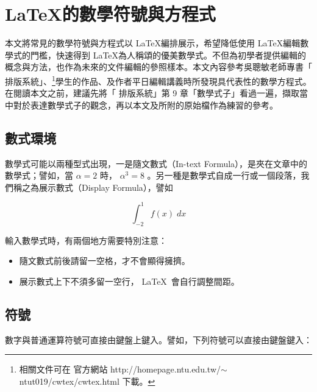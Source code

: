 %
%
\chapter{\LaTeX 的數學符號與方程式}
本文將常見的數學符號與方程式以 \LaTeX 編排展示，希望降低使用  \LaTeX 編輯數學式的門檻，快速得到  \LaTeX 為人稱頌的優美數學式。不但為初學者提供編輯的概念與方法，也作為未來的文件編輯的參照樣本。本文內容參考吳聰敏老師專書「\cw{} 排版系統」、\footnote{相關文件可在 \cw{} 官方網站 http://homepage.ntu.edu.tw/$\sim$ntut019/cwtex/cwtex.html 下載。}學生的作品、及作者平日編輯講義時所發現具代表性的數學方程式。在閱讀本文之前，建議先將「\cw{} 排版系統」第 9 章「數學式子」看過一遍，擷取當中對於表達數學式子的觀念，再以本文及所附的原始檔作為練習的參考。\\

\section{數式環境}
數學式可能以兩種型式出現，一是隨文數式（In-text Formula），是夾在文章中的數學式；譬如，當 $\alpha=2$ 時， $\alpha^3=8$ 。另一種是數學式自成一行或一個段落，我們稱之為展示數式（Display Formula），譬如

$$\int_{-2}^{1} f(x)\;dx$$

輸入數學式時，有兩個地方需要特別注意：
\begin{itemize}
\item 隨文數式前後請留一空格，才不會顯得擁擠。
\item 展示數式上下不須多留一空行， \LaTeX\ 會自行調整間距。
\end{itemize}\bigskip

\section{符號}
數字與普通運算符號可直接由鍵盤上鍵入。譬如，下列符號可以直接由鍵盤鍵入：

